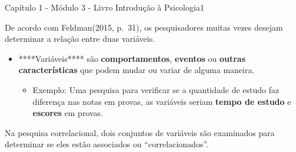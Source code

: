 \documentclass[
]{book}
\providecommand{\tightlist}{%
  \setlength{\itemsep}{0pt}\setlength{\parskip}{0pt}}
\begin{document}
Capítulo 1 - Módulo 3 - Livro Introdução à Psicologia1

De acordo com Feldman(2015, p.~31), os pesquisadores muitas vezes
desejam determinar a relação entre duas variáveis.

\begin{itemize}
\tightlist
\item
  ****Variáveis**** são \textbf{comportamentos}, \textbf{eventos} ou
  \textbf{outras características} que podem mudar ou variar de alguma
  maneira.

  \begin{itemize}
  \tightlist
  \item
    Exemplo: Uma pesquisa para verificar se a quantidade de estudo faz
    diferença nas notas em provas, as variáveis seriam \textbf{tempo de
    estudo} e \textbf{escores} em provas.
  \end{itemize}
\end{itemize}

Na pesquisa correlacional, dois conjuntos de variáveis são examinados
para determinar se eles estão associados ou ``correlacionados''.
\end{document}
